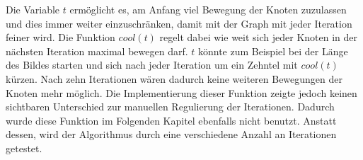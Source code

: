 Die Variable $t$ ermöglicht es, am Anfang viel Bewegung der Knoten zuzulassen und dies immer weiter einzuschränken, damit mit der Graph mit jeder Iteration feiner wird. Die Funktion $cool(t)$ regelt dabei wie weit sich jeder Knoten in der nächsten Iteration maximal bewegen darf. $t$ könnte zum Beispiel bei der Länge des Bildes starten und sich nach jeder Iteration um ein Zehntel mit $cool(t)$ kürzen. Nach zehn Iterationen wären dadurch keine weiteren Bewegungen der Knoten mehr möglich. Die Implementierung dieser Funktion zeigte jedoch keinen sichtbaren Unterschied zur manuellen Regulierung der Iterationen. Dadurch wurde diese Funktion im Folgenden Kapitel ebenfalls nicht benutzt. Anstatt dessen, wird der Algorithmus durch eine verschiedene Anzahl an Iterationen getestet. 

